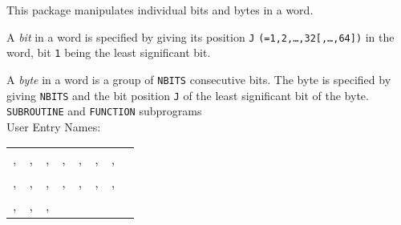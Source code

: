 \documentclass[]{cernman}
\begin{document}
                   
       
\Submitter{}                        
     
This package manipulates individual bits and bytes in a word.
\par
A {\it bit} in a word is specified by giving its position {\tt J}
\texttt{(=1,2,\ldots,32[,\ldots,64])} in the word,
bit {\tt 1} being the least significant bit.
\par
A {\it byte} in a word is a group of {\tt NBITS} consecutive bits.
The byte is specified by giving {\tt NBITS} and the bit position {\tt J}
of the least significant bit of the byte.
\Structure
{\tt SUBROUTINE} and {\tt FUNCTION} subprograms \\
User Entry Names:
\begin{tabular}[t]{l*{7}{@{\hspace{4pt}}l}}
,   & ,  & ,  & ,   &
, & , & ,  \\
,   & ,   & ,  & ,   &
,  & , & , \\
, & , & , & 
\end{tabular}
\Usage
{}
\end{document}
